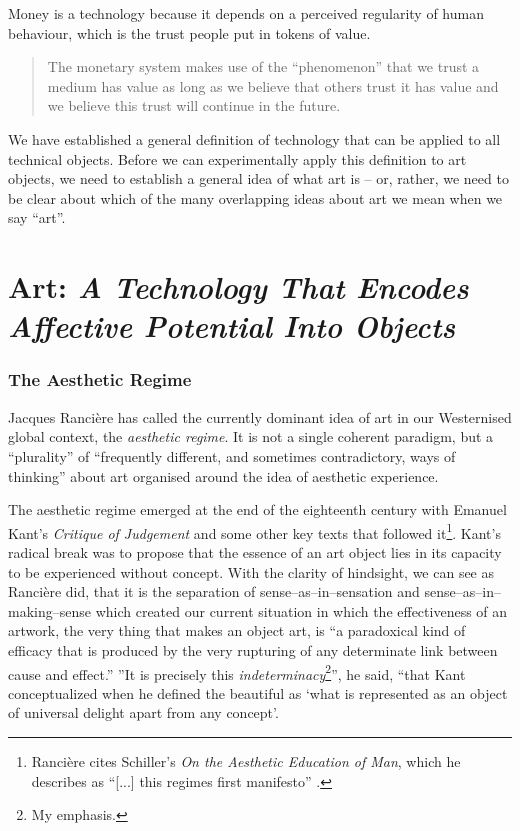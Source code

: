 \documentclass[letterpaper]{article}
\begin{document}
    Money is a technology because it depends on a perceived regularity of human behaviour, which is the trust people put in tokens of value.

    \begin{quote}
        The monetary system makes use of the “phenomenon” that we trust a medium has value as long as we believe that others trust it has value and we believe this trust will continue in the future. \citep[p.55]{theNatureOfTechnology2009}
    \end{quote}

    We have established a general definition of technology that can be applied to all technical objects. Before we can experimentally apply this definition to art objects, we need to establish a general idea of what art is – or, rather, we need to be clear about which of the many overlapping ideas about art we mean when we say “art”.

\section{Art: \emph{A Technology That Encodes Affective Potential Into Objects}}

    \subsubsection{The Aesthetic Regime}

    Jacques Rancière has called the currently dominant idea of art in our Westernised global context, the \emph{aesthetic regime}. It is not a single coherent paradigm, but a “plurality” of “frequently different, and sometimes contradictory, ways of thinking” \citep[p.8]{RanciereMdrnTms2022} about art organised around the idea of aesthetic experience.
    
    The aesthetic regime emerged at the end of the eighteenth century with Emanuel Kant's \emph{Critique of Judgement} and some other key texts that followed it\footnote{
        Rancière cites Schiller's \emph{On the Aesthetic Education of Man}, which he describes as “[...] this regimes first manifesto” \citep[pp.23–24]{RancierPltcsOfThAsthtcs2004}.
    }. Kant's radical break was to propose that the essence of an art object lies in its capacity to be experienced without concept. With the clarity of hindsight, we can see as Rancière did, that it is the separation of sense–as–in–sensation and sense–as–in–making–sense which created our current situation in which the effectiveness of an artwork, the very thing that makes an object art, is “a paradoxical kind of efficacy that is produced by the very rupturing of any determinate link between cause and effect.” \citep[p.51]{RancierThEmncptdSpcttr2009} ”It is precisely this \emph{indeterminacy}\footnote{
        My emphasis.
    }”, he said, “that Kant conceptualized when he defined the beautiful as ‘what is represented as an object of universal delight apart from any concept’. \citep[p.52]{RancierThEmncptdSpcttr2009}
\end{document}
